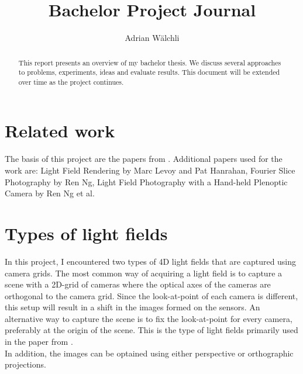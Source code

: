\documentclass[10pt,a4paper,titlepage]{report}
\author{Adrian Wälchli}
\title{Bachelor Project Journal}
\begin{document}
\maketitle
\begin{abstract}
This report presents an overview of my bachelor thesis. We discuss several approaches to problems, experiments, ideas and evaluate results. This document will be extended over time as the project continues.
\end{abstract}

\tableofcontents

\section{Related work}
The basis of this project are the papers from \cite{WETZ_TOMO, WETZ_TENS}. Additional papers used for the work are: Light Field Rendering by Marc Levoy and Pat Hanrahan, Fourier Slice Photography by Ren Ng, Light Field Photography with a Hand-held Plenoptic Camera by Ren Ng et al. 

\section{Types of light fields}
In this project, I encountered two types of 4D light fields that are captured using camera grids. The most common way of acquiring a light field is to capture a scene with a 2D-grid of cameras where the optical axes of the cameras are orthogonal to the camera grid. Since the look-at-point of each camera is different, this setup will result in a shift in the images formed on the sensors. An alternative way to capture the scene is to fix the look-at-point for every camera, preferably at the origin of the  scene. This is the type of light fields primarily used in the paper from \cite{WETZ_TOMO}. 
\\
In addition, the images can be optained using either perspective or orthographic projections. 







\end{document}
